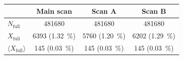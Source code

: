 \documentclass[superscriptaddress,
floatfix,
reprint,
nofootinbib,
amsmath,amssymb,
aps,
prd,
]{revtex4-2}
\begin{document}
\begin{table}[htb]
\centering
\begin{ruledtabular}
\begin{tabular}{lccc} %
\textbf{} & \textbf{Main scan} & \textbf{Scan A} & \textbf{Scan B} \\
\midrule
$N_\mathrm{full}$ & \SI{481680}{} & \SI{481680}{} & \SI{481680}{} \\
$ X_\mathrm{full}$ & \SI{6393}{} (\SI{1.32}{\%}) & \SI{5760}{} (\SI{1.20}{\%}) & \SI{6202}{} (\SI{1.29}{\%}) \\
$\langle X_\mathrm{full} \rangle$ & \SI{145}{} (\SI{0.03}{\%}) & \SI{145}{} (\SI{0.03}{\%}) & \SI{145}{} (\SI{0.03}{\%}) \\

\end{tabular}
\end{ruledtabular}
\end{table}
\end{document}
